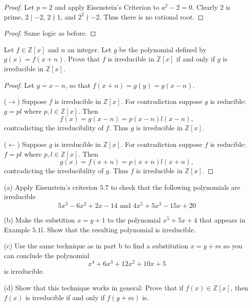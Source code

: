 \begin{proof}
    Let $p = 2$ and apply Eisenstein's Criterion to $a^2 - 2 = 0$.
    Clearly $2$ is prime, $2 \mid -2$, $2 \nmid 1$, and $2^2 \nmid -2$.
    Thus there is no rational root.
\end{proof}

\begin{proof}
    Same logic as before.
\end{proof}

\begin{tcolorbox}[title=Problem 14, breakable]
    Let $f \in \mathbb{Z}[x]$ and $n$ an integer.
    Let $g$ be the polynomial defined by $g(x) = f(x + n)$.
    Prove that $f$ is irreducible in $\mathbb{Z}[x]$ if and 
    only if $g$ is irreducible in $\mathbb{Z}[x]$.
\end{tcolorbox}

\begin{proof}
    Let $y = x - n$, so that $f(x + n) = g(y) = g(x - n)$.

    ($\rightarrow$) Suppose $f$ is irreducible in $\mathbb{Z}[x]$.
    For contradiction suppose $g$ is reducible: $g = p l$ where $p, l \in \mathbb{Z}[x]$.
    Then
    \[
        f(x) = g(x - n) = p(x - n) l(x - n),
    \]
    contradicting the irreducibility of $f$.
    Thus $g$ is irreducible in $\mathbb{Z}[x]$.

    ($\leftarrow$) Suppose $g$ is irreducible in $\mathbb{Z}[x]$.
    For contradiction suppose $f$ is reducible: $f = p l$ where $p, l \in \mathbb{Z}[x]$.
    Then
    \[
        g(x) = f(x + n) = p(x + n) l(x + n),
    \]
    contradicting the irreducibility of $g$.
    Thus $f$ is irreducible in $\mathbb{Z}[x]$.
\end{proof}


\begin{tcolorbox}[title=Problem 15, breakable]
    (a) Apply Eisenstein's criterion $5.7$ to check that the 
        following polynomials are irreducible
        \[5x^3 - 6x^2 + 2x - 14 \text{ and } 4x^5 + 5x^3 - 15x + 20\]

    (b) Make the substition $x = y + 1$ to the polynomial $x^5 + 5x + 4$
        that appears in Example $5.1$l. Show that the resulting polynomial
        is irreducible.

    (c) Use the same technique as in part b to find a substitution 
        $x = y + m$ so you can conclude the polynomial
        \[x^4 + 6x^3 + 12x^2 + 10x + 5\]
        is irreducible.

    (d) Show that this technique works in general: Prove that if 
        $f(x) \in \mathbb{Z}[x]$, then $f(x)$ is irreducible if 
        and only if $f(y + m)$ is.
\end{tcolorbox}

